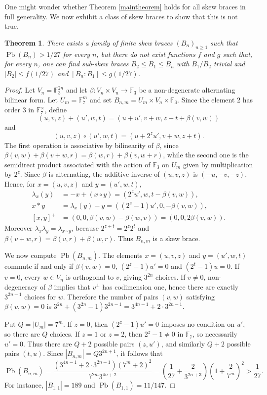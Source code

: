 \documentclass[10pt,a4paper]{amsart}
\numberwithin{equation}{section}
\newtheorem{thm}[equation]{Theorem}
\newcommand{\Pb}{\operatorname{Pb} }
\begin{document}
One might wonder whether Theorem \ref{maintheorem} holds for all skew braces in full generality. We now exhibit a class of skew braces to show that this is not true. 


\begin{thm}
There exists a family of finite skew braces $(B_n)_{n\geqslant 1}$ such that $\Pb(B_n)>1/27$ for every $n$, but there do not exist functions $f$ and $g$ such that, for every $n$, one can find sub-skew braces $B_2\leqslant B_1\leqslant B_n$ with $B_1/B_2$ trivial and
$|B_2|\leqslant f(1/27)$ and $[B_n:B_1]\leqslant g(1/27)$.
\end{thm}
\begin{proof}
Let $V_n=\mathbb F_3^{2n}$ and let $\beta:V_n\times V_n\to\mathbb F_3$ be a non-degenerate alternating bilinear form. Let $U_m=\mathbb F_7^m$ and set $B_{n,m}=U_m\times V_n\times\mathbb F_3$. Since the element $2$ has order $3$ in $\mathbb F_7^\times$, define
$$
(u,v,z)+(u',w,t)=(u+u',v+w,z+t+\beta(v,w))$$
and 
$$
(u,v,z)\circ(u',w,t)=(u+2^zu',v+w,z+t).
$$
The first operation is associative by bilinearity of $\beta$, since
$\beta(v,w)+\beta(v+w,r)=\beta(w,r)+\beta(v,w+r)$, while the second one is the semidirect product associated with the action of $\mathbb F_3$ on $U_m$ given by multiplication by $2^z$. Since $\beta$ is alternating, the additive inverse of $(u,v,z)$ is $(-u,-v,-z)$. Hence, for $x=(u,v,z)$ and $y=(u',w,t)$,
$$
\begin{aligned}
\lambda_x(y)
&=-x+(x\circ y)
 =(2^zu',w,t-\beta(v,w)),\\
x*y
&=\lambda_x(y)-y
 =((2^z-1)u',0,-\beta(v,w)),\\
[x,y]^+
&=(0,0,\beta(v,w)-\beta(w,v))
 =(0,0,2\beta(v,w)).
\end{aligned}
$$
Moreover $\lambda_x\lambda_y=\lambda_{x\circ y}$, because
$2^{z+t}=2^z2^t$ and $\beta(v+w,r)=\beta(v,r)+\beta(w,r)$. Thus $B_{n,m}$ is a skew brace.

We now compute $\Pb(B_{n,m})$. The elements $x=(u,v,z)$ and $y=(u',w,t)$ commute if and only if
$\beta(v,w)=0$, $(2^z-1)u'=0$ and $(2^t-1)u=0$. If $v=0$, every $w\in V_n$ is orthogonal to $v$, giving $3^{2n}$ choices. If $v\neq0$, non-degeneracy of $\beta$ implies that $v^\perp$ has codimension one, hence there are exactly $3^{2n-1}$ choices for $w$. Therefore the number of pairs $(v,w)$ satisfying $\beta(v,w)=0$ is
$3^{2n}+(3^{2n}-1)3^{2n-1}=3^{4n-1}+2\cdot3^{2n-1}$.

Put $Q=|U_m|=7^m$. If $z=0$, then $(2^z-1)u'=0$ imposes no condition on $u'$, so there are $Q$ choices. If $z=1$ or $z=2$, then $2^z-1\neq0$ in $\mathbb F_7$, so necessarily $u'=0$. Thus there are $Q+2$ possible pairs $(z,u')$, and similarly $Q+2$ possible pairs $(t,u)$. Since $|B_{n,m}|=Q3^{2n+1}$, it follows that
$$
\Pb(B_{n,m})
=\frac{(3^{4n-1}+2\cdot3^{2n-1})(7^m+2)^2}
{7^{2m}3^{4n+2}}
=\left(\frac1{27}+\frac{2}{3^{2n+3}}\right)
\left(1+\frac{2}{7^m}\right)^2
>\frac1{27}.
$$
For instance, $|B_{1,1}|=189$ and $\Pb(B_{1,1})=11/147$.


\end{proof}
\end{document}
